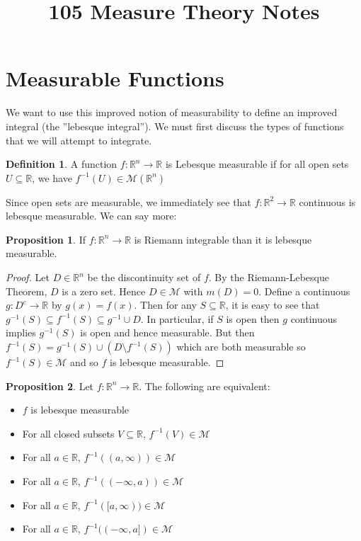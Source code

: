 \documentclass{article}
\title{105 Measure Theory Notes}
\theoremstyle{definition}
\newtheorem{definition}{Definition}[section]
\newtheorem{prop}{Proposition}[section]
\theoremstyle{remark}
\theoremstyle{remark}
\def\reals{{\mathbb R}}
\def\scriptm{{\mathcal M}}
\begin{document}
\section{Measurable Functions}
We want to use this improved notion of measurability to define an improved integral (the ''lebesque integral''). We must first discuss the types of functions that we will attempt to integrate.
\begin{definition}
A function $f: \reals^n \to \reals$ is Lebesque measurable if for all open sets $U \subseteq \reals$, we have $f^{-1}(U) \in \scriptm(\reals^n)$
\end{definition}

Since open sets are measurable, we immediately see that $f: \reals^2 \to \reals$ continuous is lebesque measurable. We can say more:
\begin{prop}
If $f: \reals^n \to \reals$ is Riemann integrable than it is lebesque measurable.
\end{prop}
\begin{proof}
Let $D\in \reals^n$ be the discontinuity set of $f$. By the Riemann-Lebesque Theorem, $D$ is a zero set. Hence $D \in \scriptm$ with $m(D) = 0$. Define a continuous $g : D^c \to \reals$ by $g(x) = f(x)$. Then for any $S \subseteq \reals$, it is easy to see that $g^{-1}(S) \subseteq f^{-1}(S) \subseteq g^{-1} \cup D$. In particular, if $S$ is open then $g$ continuous implies $g^{-1}(S)$ is open and hence measurable. But then $f^{-1}(S) = g^{-1}(S) \cup (D \setminus f^{-1}(S))$ which are both measurable so $f^{-1}(S) \in \scriptm$ and so $f$ is lebesque measurable.
\end{proof}

\begin{prop}
Let $f: \reals^n \to \reals$. The following are equivalent: \begin{itemize}
	\item $f$ is lebesque measurable
	\item For all closed subsets $V \subseteq \reals$, $f^{-1}(V) \in \scriptm$
	\item For all $a \in \reals$, $f^{-1}((a, \infty))\in \scriptm$
	\item For all $a\in\reals$, $f^{-1}((-\infty, a))\in\scriptm$
	\item For all $a\in\reals$, $f^{-1}([a, \infty))\in \scriptm$
	\item For all $a\in\reals$, $f^{-1}((-\infty, a])\in\scriptm$
\end{itemize}
\end{prop}
\end{document}
